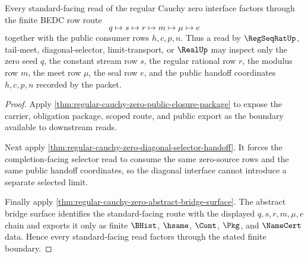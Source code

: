 \begin{theorem}
\label{thm:regular-cauchy-zero-mature-standard-boundary}
Every standard-facing read of the regular Cauchy zero interface factors
through the finite BEDC row route
$$
q \mapsto s \mapsto r \mapsto m \mapsto \mu \mapsto e
$$
together with the public consumer rows $h,c,p,n$. Thus a read by
$\RegSeqRatUp$, tail-meet, diagonal-selector, limit-transport, or $\RealUp$
may inspect only the zero seed $q$, the constant stream row $s$, the regular
rational row $r$, the modulus row $m$, the meet row $\mu$, the seal row $e$,
and the public handoff coordinates $h,c,p,n$ recorded by the packet.
\end{theorem}
\begin{proof}
Apply \autoref{thm:regular-cauchy-zero-public-closure-package} to expose the
carrier, obligation package, scoped route, and public export as the boundary
available to downstream reads.

Next apply
\autoref{thm:regular-cauchy-zero-diagonal-selector-handoff}. It forces the
completion-facing selector read to consume the same zero-source rows and the
same public handoff coordinates, so the diagonal interface cannot introduce a
separate selected limit.

Finally apply
\autoref{thm:regular-cauchy-zero-abstract-bridge-surface}. The abstract
bridge surface identifies the standard-facing route with the displayed
$q,s,r,m,\mu,e$ chain and exports it only as finite $\BHist$, $\hsame$,
$\Cont$, $\Pkg$, and $\NameCert$ data. Hence every standard-facing read
factors through the stated finite boundary.
\end{proof}

